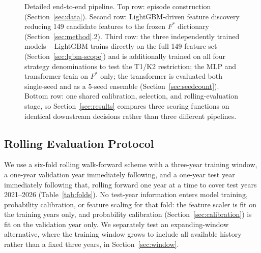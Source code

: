 \documentclass[sigconf,review,anonymous]{acmart}
\begin{document}
\begin{figure}[t]
{%
}
\caption{Detailed end-to-end pipeline. Top row: episode construction (Section~\ref{sec:data}). Second row: LightGBM-driven feature discovery reducing 149 candidate features to the frozen $F^{\ast}$ dictionary (Section~\ref{sec:method}.2). Third row: the three independently trained models -- LightGBM trains directly on the full 149-feature set (Section~\ref{sec:lgbm-scope}) and is additionally trained on all four strategy denominations to test the T1/K2 restriction; the MLP and transformer train on $F^{\ast}$ only; the transformer is evaluated both single-seed and as a 5-seed ensemble (Section~\ref{sec:seedcount}). Bottom row: one shared calibration, selection, and rolling-evaluation stage, so Section~\ref{sec:results} compares three scoring functions on identical downstream decisions rather than three different pipelines.}
\label{fig:pipeline}
\end{figure}

\subsection{Rolling Evaluation Protocol}
We use a six-fold rolling walk-forward scheme with a three-year training window, a one-year validation year immediately following, and a one-year test year immediately following that, rolling forward one year at a time to cover test years 2021--2026 (Table~\ref{tab:folds}). No test-year information enters model training, probability calibration, or feature scaling for that fold: the feature scaler is fit on the training years only, and probability calibration (Section~\ref{sec:calibration}) is fit on the validation year only. We separately test an expanding-window alternative, where the training window grows to include all available history rather than a fixed three years, in Section~\ref{sec:window}.
\end{document}
